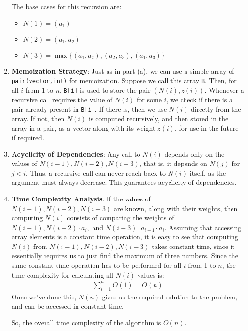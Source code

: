 \documentclass[11pt, fleqn]{article}
\begin{document}
\begin{enumerate}
\medskip

The base cases for this recursion are:
\begin{itemize}
    \item $N(1) = (a_1)$
    \item $N(2) = (a_1, a_2)$
    \item $N(3) = \max\{(a_1, a_2), (a_2, a_3), (a_1, a_3)\}$
\end{itemize}

\item \textbf{Memoization Strategy}: Just as in part (a), we can use a simple array of \texttt{pair(vector,int)} for memoization. Suppose we call this array \texttt{B}. Then, for all $i$ from 1 to $n$, \texttt{B[i]} is used to store the pair $(N(i), z(i))$. Whenever a recursive call requires the value of $N(i)$ for some $i$, we check if there is a pair already present in \texttt{B[i]}. If there is, then we use $N(i)$ directly from the array. If not, then $N(i)$ is computed recursively, and then stored in the array in a pair, as a vector along with its weight $z(i)$, for use in the future if required.

\item \textbf{Acyclicity of Dependencies}: Any call to $N(i)$ depends only on the values of $N(i-1), N(i-2), N(i-3)$, that is, it depends on $N(j)$ for $j < i$. Thus, a recursive call can never reach back to $N(i)$ itself, as the argument must always decrease. This guarantees acyclicity of dependencies.

\item \textbf{Time Complexity Analysis}: If the values of $N(i-1), N(i-2), N(i-3)$ are known, along with their weights, then computing $N(i)$ consists of comparing the weights of $N(i-1), N(i-2)\cdot a_i,$ and $N(i-3)\cdot a_{i-1}\cdot a_i$. Assuming that accessing array elements is a constant time operation, it is easy to see that computing $N(i)$ from $N(i-1), N(i-2), N(i-3)$ takes constant time, since it essentially requires us to just find the maximum of three numbers. Since the same constant time operation has to be performed for all $i$ from 1 to $n$, the time complexity for calculating all $N(i)$ values is:
\begin{align*}
    \sum_{i=1}^{n}O(1) = O(n)
\end{align*}
Once we've done this, $N(n)$ gives us the required solution to the problem, and can be accessed in constant time.

\medskip

So, the overall time complexity of the algorithm is $O(n)$.

\end{enumerate}
\end{document}
